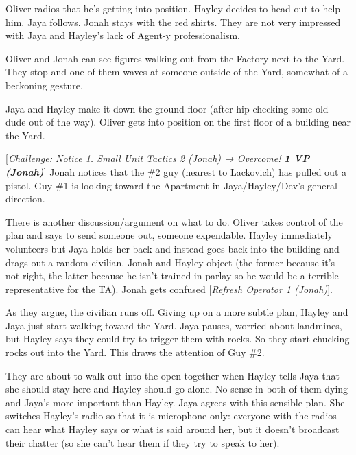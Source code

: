 Oliver radios that he's getting into position.  Hayley decides to head out to help him.  Jaya follows.  Jonah stays with the red shirts.  They are not very impressed with Jaya and Hayley's lack of Agent-y professionalism.



Oliver and Jonah can see figures walking out from the Factory next to the Yard.   They stop and one of them waves at someone outside of the Yard, somewhat of a beckoning gesture.



Jaya and Hayley make it down the ground floor (after hip-checking some old dude out of the way).  Oliver gets into position on the first floor of a building near the Yard.



{[}\textit{Challenge: Notice 1.  Small Unit Tactics 2 (Jonah) → Overcome! }\textit{\textbf{1 VP (Jonah)}}{]}  Jonah notices that the \#2 guy (nearest to Lackovich) has pulled out a pistol.  Guy \#1 is looking toward the Apartment in Jaya/Hayley/Dev's general direction. 



There is another discussion/argument on what to do.  Oliver takes control of the plan and says to send someone out, someone expendable.  Hayley immediately volunteers but Jaya holds her back and instead goes back into the building and drags out a random civilian.  Jonah and Hayley object (the former because it's not right, the latter because he isn't trained in parlay so he would be a terrible representative for the TA).   Jonah gets confused {[}\textit{Refresh Operator 1 (Jonah)}{]}.



As they argue, the civilian runs off.  Giving up on a more subtle plan, Hayley and Jaya just start walking toward the Yard.  Jaya pauses, worried about landmines, but Hayley says they could try to trigger them with rocks.  So they start chucking rocks out into the Yard.  This draws the attention of Guy \#2.



They are about to walk out into the open together when Hayley tells Jaya that she should stay here and Hayley should go alone.  No sense in both of them dying and Jaya's more important than Hayley.  Jaya agrees with this sensible plan.  She switches Hayley's radio so that it is microphone only: everyone with the radios can hear what Hayley says or what is said around her, but it doesn't broadcast their chatter (so she can't hear them if they try to speak to her).



